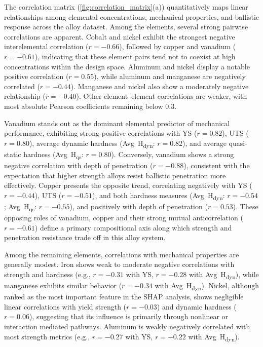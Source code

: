 The correlation matrix (\autoref{fig:correlation_matrix}(a)) quantitatively maps linear relationships among elemental concentrations, mechanical properties, and ballistic response across the alloy dataset. Among the elements, several strong pairwise correlations are apparent. Cobalt and nickel exhibit the strongest negative interelemental correlation ($r = -0.66$), followed by copper and vanadium ($r = -0.61$), indicating that these element pairs tend not to coexist at high concentrations within the design space. Aluminum and nickel display a notable positive correlation ($r = 0.55$), while aluminum and
manganese are negatively correlated ($r = -0.44$). Manganese and nickel also show a moderately negative relationship ($r = -0.40$). Other element--element correlations are weaker, with most absolute Pearson coefficients remaining below 0.3.

Vanadium stands out as the dominant elemental predictor of mechanical performance, exhibiting strong positive correlations with YS ($r = 0.82$), UTS ($r = 0.80$), average dynamic hardness (Avg~H\textsubscript{dyn}: $r = 0.82$), and average quasi-static hardness (Avg~H\textsubscript{qs}: $r = 0.80$). Conversely, vanadium shows a strong negative correlation with depth of penetration ($r = -0.88$), consistent with the expectation that higher strength alloys resist ballistic penetration more effectively. Copper presents the opposite trend, correlating negatively with YS ($r = -0.44$), UTS ($r = -0.51$), and both hardness measures (Avg~H\textsubscript{dyn}: $r = -0.54$; Avg~H\textsubscript{qs}: $r = -0.55$), and positively with depth of penetration ($r = 0.53$). These opposing roles of vanadium, copper and their strong mutual anticorrelation ($r = -0.61$) define a primary compositional axis along which strength and penetration resistance trade off in this alloy system.

Among the remaining elements, correlations with mechanical properties are generally modest. Iron shows weak to moderate negative correlations with strength and hardness (e.g., $r = -0.31$ with YS, $r = -0.28$ with Avg~H\textsubscript{dyn}), while manganese exhibits similar behavior ($r = -0.34$ with Avg~H\textsubscript{dyn}). Nickel, although ranked as the most important feature in the SHAP analysis, shows negligible linear correlations with yield strength ($r = -0.03$) and dynamic hardness ($r = 0.06$), suggesting that its influence is primarily through nonlinear or interaction mediated pathways. Aluminum is weakly negatively correlated with most strength metrics (e.g., $r = -0.27$ with YS, $r = -0.22$ with Avg~H\textsubscript{dyn}).

